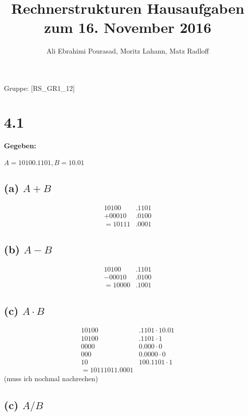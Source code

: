 \documentclass[11pt,a4paper]{article}
\title{\textbf{Rechnerstrukturen Hausaufgaben zum 16. November 2016}}
\author{Ali Ebrahimi Pourasad, Moritz Lahann, Matz Radloff}
\begin{document}
  \maketitle
  \date{}
  Gruppe: [RS\_GR1\_12]

\section*{4.1}
\label {sec:4.1}

\paragraph{Gegeben:} $A = 10100.1101, B = 10.01$

\subsection*{(a) $A+B$}

\begin{align*}
  10100&.1101\\
+ 00010&.0100\\
= 10111&.0001
\end{align*}

\subsection*{(b) $A-B$}

\begin{align*}
  10100&.1101\\
- 00010&.0100\\
= 10000&.1001
\end{align*}

\subsection*{(c) $A \cdot B$}

\begin{align*}
  10100&.1 1 01 \cdot 10.01\\
  10100&.1 1  01 \cdot 1\\
   0000& 0.0  00 \cdot 0\\
    000& 0.0  000 \cdot 0\\
     10& 1 00.1101 \cdot 1\\
=10111011.0001
\end{align*}
(muss ich nochmal nachrechen)

\subsection*{(c) $A / B$}
\end{document}
